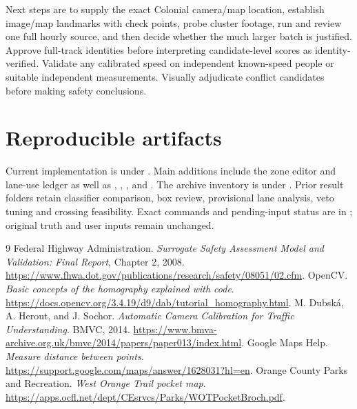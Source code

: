 \documentclass[11pt,letterpaper]{article}
\begin{document}
Next steps are to supply the exact Colonial camera/map location, establish image/map landmarks with check points, probe cluster footage, run and review one full hourly source, and then decide whether the much larger batch is justified. Approve full-track identities before interpreting candidate-level scores as identity-verified. Validate any calibrated speed on independent known-speed people or suitable independent measurements. Visually adjudicate conflict candidates before making safety conclusions.

\section{Reproducible artifacts}
Current implementation is under . Main additions include the zone editor and lane-use ledger as well as , , , and . The archive inventory is under . Prior result folders retain classifier comparison, box review, provisional lane analysis, veto tuning and crossing feasibility. Exact commands and pending-input status are in ; original truth and user inputs remain unchanged.

\clearpage
\begin{thebibliography}{9}
 Federal Highway Administration. \emph{Surrogate Safety Assessment Model and Validation: Final Report}, Chapter 2, 2008. \url{https://www.fhwa.dot.gov/publications/research/safety/08051/02.cfm}.
 OpenCV. \emph{Basic concepts of the homography explained with code}. \url{https://docs.opencv.org/3.4.19/d9/dab/tutorial_homography.html}.
 M. Dubsk\'a, A. Herout, and J. Sochor. \emph{Automatic Camera Calibration for Traffic Understanding}. BMVC, 2014. \url{https://www.bmva-archive.org.uk/bmvc/2014/papers/paper013/index.html}.
 Google Maps Help. \emph{Measure distance between points}. \url{https://support.google.com/maps/answer/1628031?hl=en}.
 Orange County Parks and Recreation. \emph{West Orange Trail pocket map}. \url{https://apps.ocfl.net/dept/CEsrvcs/Parks/WOTPocketBroch.pdf}.
\end{thebibliography}
\end{document}
